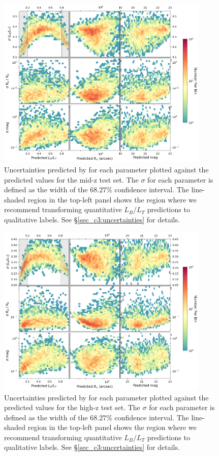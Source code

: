\begin{figure}[htb]
    \centering
    \includegraphics[width = 0.9\textwidth]{2d_uncer_mid_z.png}
    \caption{Uncertainties predicted by \gampen{} for each parameter plotted against the predicted values for the mid-z test set. The $\sigma$ for each parameter is defined as the width of the $68.27\%$ confidence interval. The line-shaded region in the top-left panel shows the region where we recommend transforming quantitative $L_B/L_T$ predictions to qualitative labels. See \S \ref{sec_c3:uncertainties} for details.}
    \label{fig_c3:2d_uncer_mid_z}
\end{figure}

\begin{figure}[htb]
    \centering
    \includegraphics[width = 0.9\textwidth]{2d_uncer_high_z.png}
    \caption{Uncertainties predicted by \gampen{} for each parameter plotted against the predicted values for the high-z test set. The $\sigma$ for each parameter is defined as the width of the $68.27\%$ confidence interval. The line-shaded region in the top-left panel shows the region where we recommend transforming quantitative $L_B/L_T$ predictions to qualitative labels. See \S \ref{sec_c3:uncertainties} for details.}
    \label{fig_c3:2d_uncer_high_z}
\end{figure}


